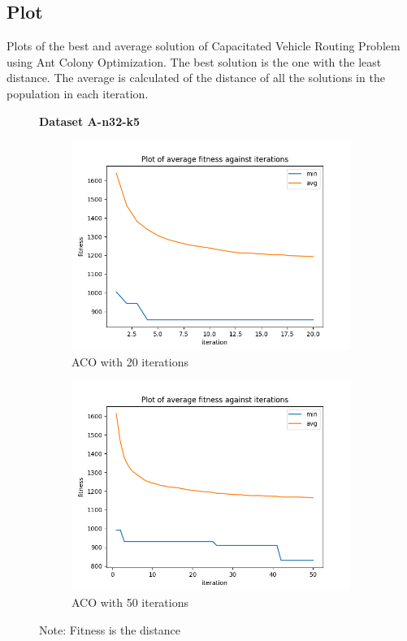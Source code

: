 \documentclass{article}
\begin{document}
\subsection{Plot}
Plots of the best and average solution of Capacitated Vehicle Routing Problem using Ant Colony Optimization. The best solution is the one with the least distance. The average is calculated of the distance of all the solutions in the population in each iteration.
\begin{figure}[H]
  \centering
  \textbf{Dataset A-n32-k5}
  \begin{subfigure}{.5\textwidth}
    \centering
    \includegraphics[width=1\linewidth]{images/n32-k5_20.png}
    \caption{ACO with 20 iterations}
    \label{fig:n32-k5_20}
  \end{subfigure}%
  \begin{subfigure}{.5\textwidth}
    \centering
    \includegraphics[width=1\linewidth]{images/n32-k5_50.png}
    \caption{ACO with 50 iterations}
    \label{fig:n32-k5_50}
  \end{subfigure}
  \caption{Note: Fitness is the distance}
  \label{fig:n32-k5}
\end{figure}
\end{document}
